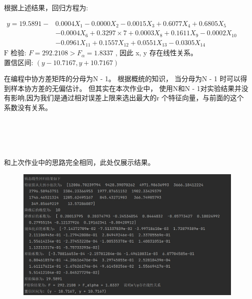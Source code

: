 \documentclass[UTF8]{ctexart}
\begin{document}
\noindent 根据上述结果，回归方程为:

$\begin{aligned} y=19.5891-& 0.0004 X_1-0.0000 X_2-0.0015 X_3+0.6077 X_4+0.6805 X_5 \\ &-0.0004 X_6+0.3297 \times 7+0.0003 X_8+0.1611 X_9-0.0002 X_{10} \\ &-0.0961 X_{11}+0.1557 X_{12}+0.0551 X_{13}-0.0305 X_14 \end{aligned}$\\


\noindent $ \mathrm{F}$  检验: $F = 292.2108 > F_\alpha = 1.8337  $ , 因此  x, y  存在线性关系。\\

\noindent 置信区间:  $(y - 10.7167, y + 10.7167) $\\


\noindent \textbf{}

在编程中协方差矩阵的分母为N - 1。 根据概统的知识， 当分母为N - 1 时可以得到样本协方差的无偏估计。 但其实在本次作业中， 使用N和N - 1对实验结果并没有影响,因为我们是通过相对误差上限来选出最大的r 个特征向量，与前面的这个系数没有关系。\\\\\\\\

\noindent \textbf{}\\

\noindent \textbf{}

和上次作业中的思路完全相同，此处仅展示结果。

\noindent \textbf{}

\begin{figure}[H]
  \centering
  \includegraphics[scale=0.3]{病态结果.jpg}
\end{figure}
\end{document}
